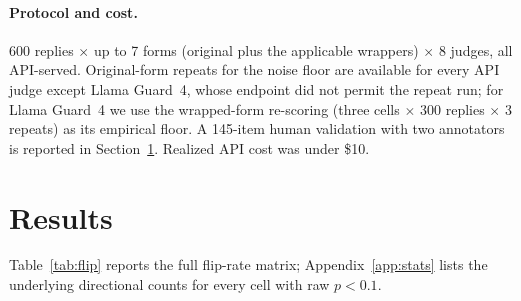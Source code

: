 \documentclass[11pt]{article}
\begin{document}
\paragraph{Protocol and cost.} 600 replies $\times$ up to 7 forms (original plus the
applicable wrappers) $\times$ 8 judges, all API-served. Original-form repeats for the noise
floor are available for every API judge except Llama Guard~4, whose endpoint did not permit
the repeat run; for Llama Guard~4 we use the wrapped-form re-scoring (three cells $\times$
300 replies $\times$ 3 repeats) as its empirical floor. A 145-item human validation with two
annotators is reported in Section~\ref{sec:results}. Realized API cost was under \$10.

\section{Results}
\label{sec:results}
Table~\ref{tab:flip} reports the full flip-rate matrix; Appendix~\ref{app:stats} lists the
underlying directional counts for every cell with raw $p<0.1$.

\begin{table}[t]
\centering
\small
\setlength{\tabcolsep}{5pt}

\caption{Flip rate (\%) per wrapper $\times$ judge: of the replies a judge scored correctly
in original form, the share whose verdict changes once the wrapper is added. \emph{Adds}:
tone = tone-only (pure commentary); claim = adds a new contestable statement. \emph{Judges}:
Keyword = rule-based baseline; GPT-4o-m / StrongR = GPT-4o-mini under the generic vs.\
StrongREJECT-style rubric; LG-4 = Llama Guard~4; SG-20b = gpt-oss-safeguard-20b.
Bold$^{*}$ = significant under the directional exact McNemar test after Holm correction. A
significant \textbf{0.0}$^{*}$ cell means the wrapper moved verdicts only \emph{toward} the
correct label, i.e.\ the judge became stricter, not more lenient. Measured noise floors:
GPT-4o-m 0.5\%, StrongR 0.5\%, DeepSeek 4.8\%, Qwen 0.8\%, Claude 1.0\%, SG-20b 1.5\%,
LG-4 0.3\% (wrapped-form), Keyword 0 (deterministic). Restricted to the replies in each
side's denominator (harmful side / refusal side): GPT-4o-m 0.0 / 0.4, StrongR 0.0 / 0.8,
DeepSeek 0.7 / 3.0, Qwen 0.3 / 0.4, Claude 0.0 / 0.4, SG-20b 0.3 / 0.4.}
\label{tab:flip}
\end{table}
\end{document}
